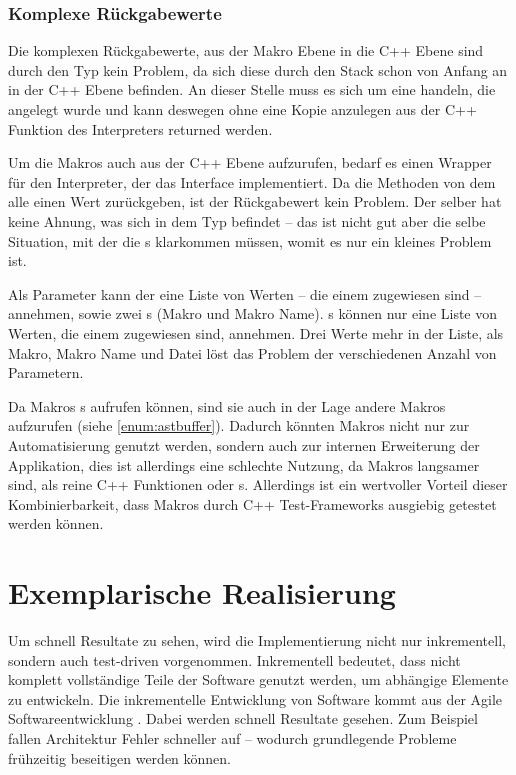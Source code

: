 {    %
    \subsubsection{Komplexe Rückgabewerte}
    \label{sssec:Komplexe Rückgabewerte}
      Die komplexen Rückgabewerte, aus der Makro Ebene in die C++ Ebene sind durch den  Typ kein Problem, da sich diese durch den Stack schon von Anfang an in der C++ Ebene befinden. An dieser Stelle muss es sich um eine  handeln, die angelegt wurde und kann deswegen ohne eine Kopie anzulegen aus der C++ Funktion des Interpreters returned werden.

      Um die Makros auch aus der C++ Ebene aufzurufen, bedarf es einen Wrapper für den Interpreter, der das  Interface implementiert. Da die  Methoden von dem  alle einen  Wert zurückgeben, ist der Rückgabewert kein Problem. Der  selber hat keine Ahnung, was sich in dem  Typ befindet -- das ist nicht gut aber die selbe Situation, mit der die s klarkommen müssen, womit es nur ein kleines Problem ist.

      Als Parameter kann der  eine Liste von  Werten -- die einem  zugewiesen sind -- annehmen, sowie zwei s (Makro und Makro Name). s können nur eine Liste von  Werten, die einem  zugewiesen sind, annehmen. Drei  Werte mehr in der Liste, als Makro, Makro Name und Datei löst das Problem der verschiedenen Anzahl von Parametern.

      Da Makros s aufrufen können, sind sie auch in der Lage andere Makros aufzurufen (siehe \ref{enum:astbuffer}). Dadurch könnten Makros nicht nur zur Automatisierung genutzt werden, sondern auch zur internen Erweiterung der Applikation, dies ist allerdings eine schlechte Nutzung, da Makros langsamer sind, als reine C++ Funktionen oder s. Allerdings ist ein wertvoller Vorteil dieser Kombinierbarkeit, dass Makros durch C++ Test-Frameworks ausgiebig getestet werden können.

\section{Exemplarische Realisierung}
\label{sec:Exemplarische Realisierung}
  Um schnell Resultate zu sehen, wird die Implementierung nicht nur inkrementell, sondern auch test-driven \autocite{beck2003test} vorgenommen. Inkrementell bedeutet, dass nicht komplett vollständige Teile der Software genutzt werden, um abhängige Elemente zu entwickeln. Die inkrementelle Entwicklung von Software kommt aus der Agile Softwareentwicklung \autocite{cohen2003agile}. Dabei werden schnell Resultate gesehen. Zum Beispiel fallen Architektur Fehler schneller auf -- wodurch grundlegende Probleme frühzeitig beseitigen werden können.

}
